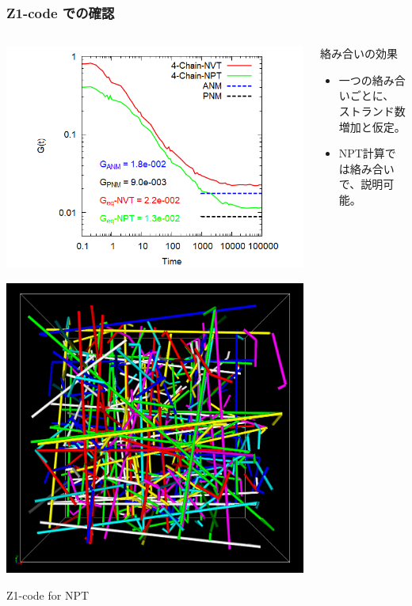 \documentclass[12pt, dvipdfmx]{beamer}
\begin{document}
\begin{frame}
    \frametitle{Z1-code での確認}
    \vspace{-3mm}
        \begin{columns}[T, onlytextwidth]
            \vspace{-3mm}
            \begin{center}
                \includegraphics[width=\textwidth]{gt_4chain_comp.png}
                
                \vspace{3mm}
                \includegraphics[width=.7\textwidth]{z_cord_NPT_4Chain.png}

                \scriptsize
                Z1-code for NPT
            \end{center}
            \begin{block}{絡み合いの効果}
                \begin{itemize}
                    \item 一つの絡み合いごとに、\\ストランド数増加と仮定。
                    \item NPT計算では絡み合いで、説明可能。
                \end{itemize}


\end{block}
\end{columns}
\end{frame}
\end{document}

